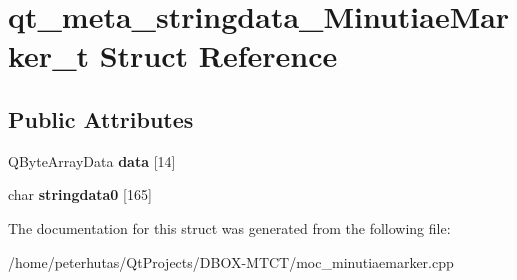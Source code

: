 \hypertarget{structqt__meta__stringdata___minutiae_marker__t}{}\section{qt\+\_\+meta\+\_\+stringdata\+\_\+\+Minutiae\+Marker\+\_\+t Struct Reference}
\label{structqt__meta__stringdata___minutiae_marker__t}
\subsection*{Public Attributes}
\begin{DoxyCompactItemize}
\item 
\mbox{\label{structqt__meta__stringdata___minutiae_marker__t_aeeb899531d435d5bcb14a36ab17e3b4d}} 
Q\+Byte\+Array\+Data {\bfseries data} \mbox{[}14\mbox{]}
\item 
\mbox{\label{structqt__meta__stringdata___minutiae_marker__t_a5bbce046656f7f278101da513a83334e}} 
char {\bfseries stringdata0} \mbox{[}165\mbox{]}
\end{DoxyCompactItemize}


The documentation for this struct was generated from the following file\+:\begin{DoxyCompactItemize}
\item 
/home/peterhutas/\+Qt\+Projects/\+D\+B\+O\+X-\/\+M\+T\+C\+T/moc\+\_\+minutiaemarker.\+cpp\end{DoxyCompactItemize}
